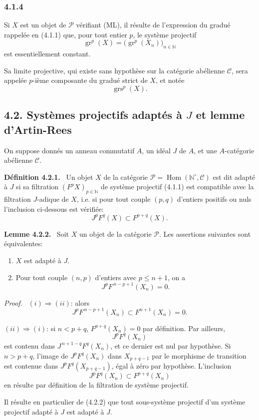 \documentclass[11pt]{article}
\newenvironment{statement}[1]{\par\medskip\noindent\textbf{#1.}\ }{\par\medskip}
\newenvironment{prooftext}[1][Proof]{\par\noindent\emph{#1.}\ }{\par\medskip}
\DeclareMathOperator{\Hom}{Hom}
\providecommand{\gr}{\operatorname{gr}}
\providecommand{\Hom}{\operatorname{Hom}}
\providecommand{\gr}{\operatorname{gr}}
\providecommand{\gr}{\operatorname{gr}}
\providecommand{\grs}{\operatorname{grs}}
\providecommand{\Hom}{\operatorname{Hom}}
\begin{document}
\subsubsection*{4.1.4}
Si $X$ est un objet de \(\mathcal P\) vérifiant (ML), il résulte de l'expression du gradué rappelée en (4.1.1) que, pour tout entier \(p\), le système projectif
\[
\gr^p(X)=\bigl(\gr^p(X_n)\bigr)_{n\in\mathbb N}
\]
est essentiellement constant.

Sa limite projective, qui existe sans hypothèse sur la catégorie abélienne \(\mathcal C\), sera appelée \(p\)-ième composante du gradué strict de \(X\), et notée
\[
\grs^p(X).
\]

\subsection*{4.2. Systèmes projectifs adaptés à \(J\) et lemme d'Artin-Rees}

On suppose donnés un anneau commutatif \(A\), un idéal \(J\) de \(A\), et une \(A\)-catégorie abélienne \(\mathcal C\).

\begin{statement}{Définition 4.2.1}
Un objet \(X\) de la catégorie \(\mathcal P=\Hom(\mathbb N^\circ,\mathcal C)\) est dit adapté à \(J\) si sa filtration \((F^pX)_{p\in\mathbb N}\) de système projectif (4.1.1) est compatible avec la filtration \(J\)-adique de \(X\), i.e. si pour tout couple \((p,q)\) d'entiers positifs ou nuls l'inclusion ci-dessous est vérifiée:
\[
J^pF^q(X)\subset F^{p+q}(X).
\]
\end{statement}

\begin{statement}{Lemme 4.2.2}
Soit \(X\) un objet de la catégorie \(\mathcal P\). Les assertions suivantes sont équivalentes:
\begin{enumerate}[label=\textup{(\roman*)}]
\item \(X\) est adapté à \(J\).
\item Pour tout couple \((n,p)\) d'entiers avec \(p\le n+1\), on a
\[
J^pF^{\,n-p+1}(X_n)=0 .
\]
\end{enumerate}
\end{statement}

\begin{prooftext}
\((i)\Rightarrow(ii)\): alors
\[
J^pF^{\,n-p+1}(X_n)\subset F^{n+1}(X_n)=0.
\]

\((ii)\Rightarrow(i)\): si \(n<p+q\), \(F^{p+q}(X_n)=0\) par définition. Par ailleurs,
\[
J^pF^q(X_n)
\]
est contenu dans \(J^{\,n+1-q}F^q(X_n)\), et ce dernier est nul par hypothèse. Si \(n>p+q\), l'image de \(J^pF^q(X_n)\) dans \(X_{p+q-1}\) par le morphisme de transition est contenue dans \(J^pF^q(X_{p+q-1})\), égal à zéro par hypothèse. L'inclusion
\[
J^pF^q(X_n)\subset F^{p+q}(X_n)
\]
en résulte par définition de la filtration de système projectif.

Il résulte en particulier de (4.2.2) que tout sous-système projectif d'un système projectif adapté à \(J\) est adapté à \(J\).
\end{prooftext}
\end{document}
